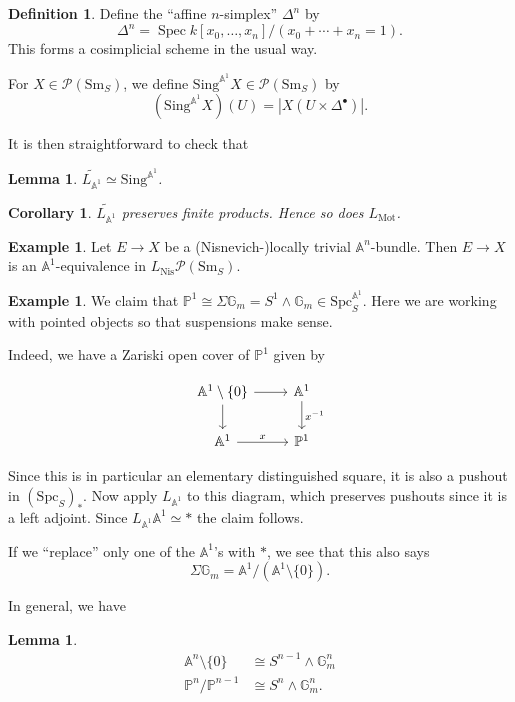 \documentclass{shortart}
\newtheorem{lemma}[thm]{Lemma}
\newtheorem{cor}[thm]{Corollary}
\theoremstyle{definition}
\newtheorem{defi}[thm]{Definition}
\newtheorem{eg}[thm]{Example}
\newcommand\Sm{\mathrm{Sm}}
\newcommand\Spc{\mathrm{Spc}}
\newcommand\Sing{\mathrm{Sing}}
\newcommand\Nis{\mathrm{Nis}}
\newcommand\Pre{\mathcal{P}}
\renewcommand\P{\mathbb{P}}
\newcommand\A{\mathbb{A}}
\newcommand\G{\mathbb{G}}
\newcommand\Mot{\mathrm{Mot}}
\DeclareMathOperator\Spec{Spec}
\begin{document}
\begin{defi}
  Define the ``affine $n$-simplex'' $\Delta^n$ by
  \[
    \Delta^n = \Spec k[x_0, \ldots, x_n]/(x_0 + \cdots + x_n = 1).
  \]
  This forms a cosimplicial scheme in the usual way.

  For $X \in \Pre(\Sm_S)$, we define $\Sing^{\A^1}X \in \Pre(\Sm_S)$ by
  \[
    (\Sing^{\A^1}X)(U) = |X(U \times \Delta^\bullet)|.
  \]
\end{defi}

It is then straightforward to check that
\begin{lemma}
  $\widetilde{L_{\A^1}} \simeq \Sing^{\A^1}$.
\end{lemma}

\begin{cor}
  $\widetilde{L_{\A^1}}$ preserves finite products. Hence so does $L_{\Mot}$.
\end{cor}

\begin{eg}
  Let $E \to X$ be a (Nisnevich-)locally trivial $\A^n$-bundle. Then $E \to X$ is an $\A^1$-equivalence in $L_{\Nis}\Pre(\Sm_S)$.
\end{eg}

\begin{eg}
  We claim that $\P^1 \cong \Sigma \G_m = S^1 \wedge \G_m \in \Spc_S^{\A^1}$. Here we are working with pointed objects so that suspensions make sense.

  Indeed, we have a Zariski open cover of $\P^1$ given by
  \begin{useimager}
    \[
      \begin{tikzcd}
        \A^1 \setminus \{0\} \ar[r] \ar[d] & \A^1 \ar[d, "x^{-1}"]\\
        \A^1 \ar[r, "x"] & \P^1
      \end{tikzcd}
    \]
  \end{useimager}
  Since this is in particular an elementary distinguished square, it is also a pushout in $(\Spc_S)_*$. Now apply $L_{\A^1}$ to this diagram, which preserves pushouts since it is a left adjoint. Since $L_{\A^1} \A^1 \simeq *$ the claim follows.

  If we ``replace'' only one of the $\A^1$'s with $*$, we see that this also says
  \[
    \Sigma \G_m = \A^1 / (\A^1 \setminus \{0\}).
  \]
\end{eg}

In general, we have
\begin{lemma}
  \[
    \begin{aligned}
      \A^n \setminus \{0\} &\cong S^{n - 1} \wedge \G_m^n\\
      \P^n / \P^{n - 1} &\cong S^n \wedge \G_m^n.
    \end{aligned}
  \]
\end{lemma}
\end{document}
